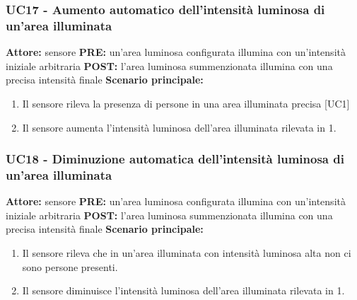 \documentclass[a4paper, 12pt]{article}
\begin{document}
\subsubsection{UC17 - Aumento automatico dell'intensità luminosa di un'area illuminata}
\textbf{Attore:} sensore\newline
\textbf{PRE:} un'area luminosa configurata illumina con un'intensità iniziale arbitraria\newline
\textbf{POST:} l'area luminosa summenzionata illumina con una precisa intensità finale\newline
\textbf{Scenario principale:}
\begin{enumerate}
    \item Il sensore rileva la presenza di persone in una area illuminata precisa [UC1]
    \item Il sensore aumenta l'intensità luminosa dell'area illuminata rilevata in 1.
\end{enumerate}

\subsubsection{UC18 - Diminuzione automatica dell'intensità luminosa di un'area illuminata}
\textbf{Attore:} sensore\newline
\textbf{PRE:} un'area luminosa configurata illumina con un'intensità iniziale arbitraria\newline
\textbf{POST:} l'area luminosa summenzionata illumina con una precisa intensità finale\newline
\textbf{Scenario principale:}
\begin{enumerate}
    \item Il sensore rileva che in un'area illuminata con intensità luminosa alta non ci sono persone presenti.
    \item Il sensore diminuisce l'intensità luminosa dell'area illuminata rilevata in 1.
\end{enumerate}
\end{document}
